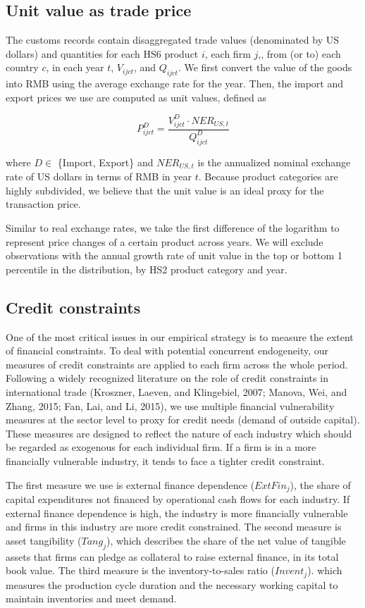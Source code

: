 \subsection{Unit value as trade price}

The customs records contain disaggregated trade values (denominated by US dollars) and quantities for each HS6 product $i$, each firm $j$,, from (or to) each country $c$, in each year $t$, $V_{ijct}$, and $Q_{ijct}$. We first convert the value of the goods into RMB using the average exchange rate for the year. Then, the import and export prices we use are computed as unit values, defined as 

$$
P^{D}_{ijct}=\frac{V^{D}_{ijct}\cdot NER_{US,t}}{Q^{D}_{ijct}}
$$

where $D \in$ \{Import, Export\} and $NER_{US,t}$ is the annualized nominal exchange rate of US dollars in terms of RMB in year $t$. Because product categories are highly subdivided, we believe that the unit value is an ideal proxy for the transaction price.

Similar to real exchange rates, we take the first difference of the logarithm to represent price changes of a certain product across years. We will exclude observations with the annual growth rate of unit value in the top or bottom 1 percentile in the distribution, by HS2 product category and year.

\subsection{Credit constraints}\label{sec-4.2.2}

One of the most critical issues in our empirical strategy is to measure the extent of financial constraints. To deal with potential concurrent endogeneity, our measures of credit constraints are applied to each firm across the whole period. Following a widely recognized literature on the role of credit constraints in international trade (Kroszner, Laeven, and Klingebiel, 2007\cite{kroszner2007}; Manova, Wei, and Zhang, 2015\cite{manova-wei-zhang2015}; Fan, Lai, and Li, 2015\cite{fan-lai-li2015}), we use multiple financial vulnerability measures at the sector level to proxy for credit needs (demand of outside capital). These measures are designed to reflect the nature of each industry which should be regarded as exogenous for each individual firm. If a firm is in a more financially vulnerable industry, it tends to face a tighter credit constraint.

The first measure we use is external finance dependence ($ExtFin_j$), the share of capital expenditures not financed by operational cash flows for each industry. If external finance dependence is high, the industry is more financially vulnerable and firms in this industry are more credit constrained.  The second measure is asset tangibility ($Tang_j$), which describes the share of the net value of tangible assets that firms can pledge as collateral to raise external finance, in its total book value. The third measure is the inventory-to-sales ratio ($Invent_j$). which measures the production cycle duration and the necessary working capital to maintain inventories and meet demand. 

